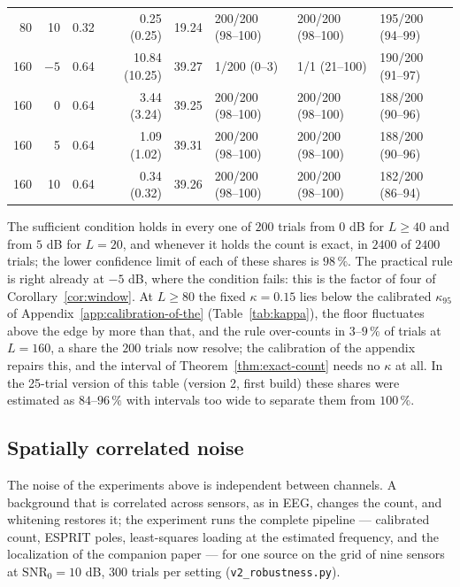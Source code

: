 \documentclass{article}
\begin{document}
\begin{table}[htb]
\begin{tabular}{r r r r r l l l}
80 & 10 & 0.32 & 0.25 (0.25) & 19.24 & 200/200 (98--100) & 200/200 (98--100) & 195/200 (94--99) \\
160 & $-5$ & 0.64 & 10.84 (10.25) & 39.27 & 1/200 (0--3) & 1/1 (21--100) & 190/200 (91--97) \\
160 & 0 & 0.64 & 3.44 (3.24) & 39.25 & 200/200 (98--100) & 200/200 (98--100) & 188/200 (90--96) \\
160 & 5 & 0.64 & 1.09 (1.02) & 39.31 & 200/200 (98--100) & 200/200 (98--100) & 188/200 (90--96) \\
160 & 10 & 0.64 & 0.34 (0.32) & 39.26 & 200/200 (98--100) & 200/200 (98--100) & 182/200 (86--94) \\
\bottomrule
\end{tabular}
\end{table}

The sufficient condition holds in every one of $200$ trials from $0$ dB for $L \ge 40$ and from $5$ dB for $L = 20$, and whenever it holds the count is exact, in $2400$ of $2400$ trials; the lower confidence limit of each of these shares is $98\,\%$. The practical rule is right already at $-5$ dB, where the condition fails: this is the factor of four of Corollary~\ref{cor:window}. At $L \ge 80$ the fixed $\kappa = 0.15$ lies below the calibrated $\kappa_{95}$ of Appendix~\ref{app:calibration-of-the} (Table~\ref{tab:kappa}), the floor fluctuates above the edge by more than that, and the rule over-counts in $3$--$9\,\%$ of trials at $L = 160$, a share the $200$ trials now resolve; the calibration of the appendix repairs this, and the interval of Theorem~\ref{thm:exact-count} needs no $\kappa$ at all. In the 25-trial version of this table (version 2, first build) these shares were estimated as $84$--$96\,\%$ with intervals too wide to separate them from $100\,\%$.


\subsection{Spatially correlated noise}\label{sec:robustness}

The noise of the experiments above is independent between channels. A background that is correlated across sensors, as in EEG, changes the count, and whitening restores it; the experiment runs the complete pipeline --- calibrated count, ESPRIT poles, least-squares loading at the estimated frequency, and the localization of the companion paper --- for one source on the grid of nine sensors at $\mathrm{SNR}_0 = 10$ dB, 300 trials per setting (\texttt{v2\_robustness.py}).
\end{document}
